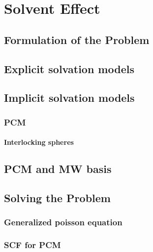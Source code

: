 \documentclass[../master_thesis.tex]{subfiles}
\begin{document}
\chapter{Solvent Effect}
\section{Formulation of the Problem}
\section{Explicit solvation models}
\section{Implicit solvation models}
\subsection{\ac{PCM}}
\subsubsection{Interlocking spheres}
\section{\ac{PCM} and MW basis}
\section{Solving the Problem}
\subsection{Generalized poisson equation}
\subsection{\ac{SCF} for \ac{PCM}}

\biblio
\end{document}
